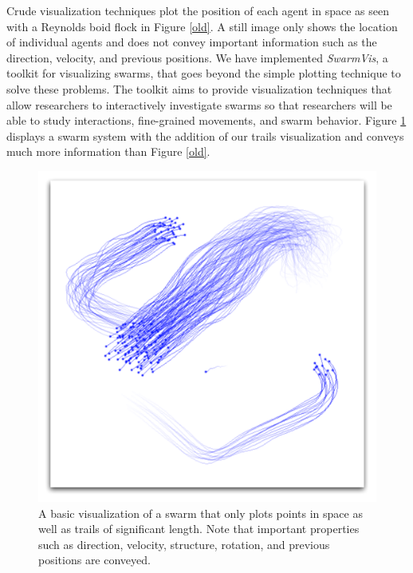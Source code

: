 \documentclass[conference]{IEEEtran}
\begin{document}
Crude visualization techniques plot the position of each agent in space as seen with a Reynolds boid flock\cite{reynolds1987} in Figure \ref{old}. A still image only shows the location of individual agents and does not convey important information such as the direction, velocity, and previous positions.
We have implemented \textit{SwarmVis}, a toolkit for visualizing swarms, that goes beyond the simple plotting technique to solve these problems. The toolkit aims to provide visualization techniques that allow researchers to interactively investigate swarms so that researchers will be able to study interactions, fine-grained movements, and swarm behavior. Figure \ref{ShowOff} displays a swarm system with
the addition of our trails visualization and conveys much more information than Figure \ref{old}.

\begin{figure}[ht]
\centering
\includegraphics[scale=.42]{images/showoff.pdf}
\caption{A basic visualization of a swarm that only plots points in space as well as trails of significant length.
Note that important properties such as direction, velocity, structure, rotation,
and previous positions are conveyed.}
\label{ShowOff}
\end{figure}
\end{document}
